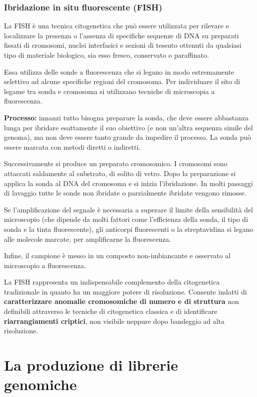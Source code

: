 \documentclass[11pt]{book}
\begin{document}
\subsection{Ibridazione in situ fluorescente
(FISH)}\label{ibridazione-in-situ-fluorescente-fish}

La FISH è una tecnica citogenetica che può essere utilizzata per
rilevare e localizzare la presenza o l'assenza di specifiche sequenze di
DNA su preparati fissati di cromosomi, nuclei interfasici e sezioni di
tessuto ottenuti da qualsiasi tipo di materiale biologico, sia esso
fresco, conservato o paraffinato.

Essa utilizza delle sonde a fluorescenza che si legano in modo
estremamente selettivo ad alcune specifiche regioni del cromosoma. Per
individuare il sito di legame tra sonda e cromosoma si utilizzano
tecniche di microscopia a fluorescenza.

\textbf{Processo:} innanzi tutto bisogna preparare la sonda, che deve
essere abbastanza lunga per ibridare esattamente il suo obiettivo (e non
un'altra sequenza simile del genoma), ma non deve essere tanto grande da
impedire il processo. La sonda può essere marcata con metodi diretti o
indiretti.

Successivamente si produce un preparato cromosomico. I cromosomi sono
attaccati saldamente al substrato, di solito di vetro. Dopo la
preparazione si applica la sonda al DNA del cromosoma e si inizia
l'ibridazione. In molti passaggi di lavaggio tutte le sonde non ibridate
o parzialmente ibridate vengono rimosse.

Se l'amplificazione del segnale è necessaria a superare il limite della
sensibilità del microscopio (che dipende da molti fattori come
l'efficienza della sonda, il tipo di sonda e la tinta fluorescente), gli
anticorpi fluorescenti o la streptavidina si legano alle molecole
marcate, per amplificarne la fluorescenza.

Infine, il campione è messo in un composto non-imbiancante e osservato
al microscopio a fluorescenza.

La FISH rappresenta un indispensabile complemento della citogenetica
tradizionale in quanto ha un maggiore potere di risoluzione. Consente
indatti di \textbf{caratterizzare anomalie cromosomiche di numero e di
struttura} non definibili attraverso le tecniche di citogenetica
classica e di identificare \textbf{riarrangiamenti criptici}, non
visibile neppure dopo bandeggio ad alta risoluzione.

\chapter{La produzione di librerie genomiche}\label{la-produzione-di-librerie-genomiche}
\end{document}

